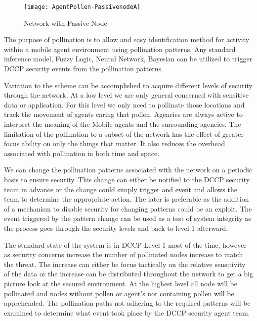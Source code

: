\documentclass{acm_proc_article-sp}
\begin{document}
\begin{figure}
\centering
\texttt{[image: AgentPollen-PassivenodeA]}
\caption{Network with Passive Node}
\end{figure}

The purpose of pollination is to allow and easy identification method for activity within a mobile agent environment using pollination patterns. Any standard inference model, Fuzzy Logic, Neural Network, Bayesian can be utilized to trigger DCCP security events from the pollination patterns.

Variation to the scheme can be accomplished to acquire different levels of security through the network. At a low level we are only general concerned with sensitive data or application. For this level we only need to pollinate those locations and track the movement of agents caring that pollen. Agencies are always active to interpret the meaning of the Mobile agents and the surrounding agencies. The limitation of the pollination to a subset of the network has the effect of greater focus ability on only the things that matter. It also reduces the overhead associated with pollination in both time and space.

We can change the pollination patterns associated with the network on a periodic basis to ensure security. This change can either be notified to the DCCP security team in advance or the change could simply trigger and event and allows the team to determine the appropriate action. The later is preferable as the addition of a mechanism to disable security for changing patterns could be an exploit. The event triggered by the pattern change can be used as a test of system integrity as the process goes through the security levels and back to level 1 afterward.

The standard state of the system is in DCCP Level 1 most of the time, however as security concerns increase the number of pollinated nodes increase to match the threat. The increase can either be focus tactically on the relative sensitivity of the data or the increase can be distributed throughout the network to get a big picture look at the secured environment. At the highest level all node will be pollinated and nodes without pollen or agent’s not containing pollen will be apprehended. The pollination paths not adhering to the required patterns will be examined to determine what event took place by the DCCP security agent team.
\end{document}
